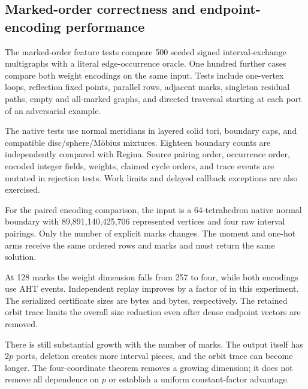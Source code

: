 \subsection{Marked-order correctness and endpoint-encoding performance}

The marked-order feature tests compare 500 seeded signed interval-exchange
multigraphs with a literal edge-occurrence oracle. One hundred further
cases compare both weight encodings on the same input. Tests include
one-vertex loops, reflection fixed points, parallel rows, adjacent marks,
singleton residual paths, empty and all-marked graphs, and directed
traversal starting at each port of an adversarial example.

The native tests use normal meridians in layered solid tori, boundary
caps, and compatible disc/sphere/M\"obius mixtures. Eighteen boundary counts
are independently compared with Regina. Source pairing order, occurrence
order, encoded integer fields, weights, claimed cycle orders, and trace
events are mutated in rejection tests. Work limits and delayed callback
exceptions are also exercised.

For the paired encoding comparison, the input is a 64-tetrahedron native
normal boundary with 89,891,140,425,706 represented vertices and four raw
interval pairings. Only the number of explicit marks changes. The moment
and one-hot arms receive the same ordered rows and marks and must return
the same solution.

\begin{table}[htbp]
\centering

\caption{Matched endpoint encodings on one native boundary. Producer times
include certificate recording. Replay is measured separately with the
independent consumer. All times are milliseconds.}
\label{tab:encoding}
\end{table}

At 128 marks the weight dimension falls from 257 to four, while both
encodings use \BoundaryTraceMax{} AHT events. Independent replay improves
by a factor of \BoundaryReplaySpeedupMax{} in this experiment.
The serialized certificate sizes are \BoundaryMomentBytes{} bytes and
\BoundaryBasisBytes{} bytes, respectively. The retained orbit trace limits
the overall size reduction even after dense endpoint vectors are removed.

There is still substantial growth with the number of marks. The output
itself has $2p$ ports, deletion creates more interval pieces, and the orbit
trace can become longer. The four-coordinate theorem removes a growing
dimension; it does not remove all dependence on $p$ or establish a
uniform constant-factor advantage.

